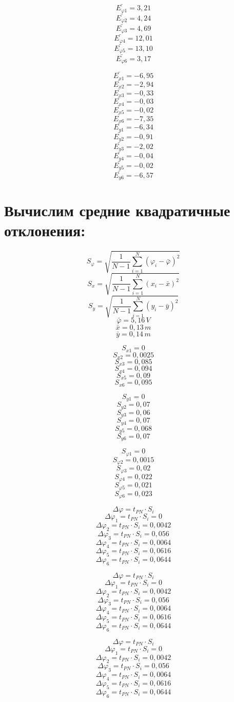 \documentclass[a4paper,12pt]{report}
\begin{document}
\[ \bar{E_{\varphi1}} =  3,21\]
\[ \bar{E_{\varphi2}} =  4,24\]
\[ \bar{E_{\varphi3}} =  4,69\]
\[ \bar{E_{\varphi4}} = 12,01\]
\[ \bar{E_{\varphi5}} = 13,10\]
\[ \bar{E_{\varphi6}} = 3,17 \]

\[ \bar{E_{x1}} = -6,95\]
\[ \bar{E_{x2}} = -2,94\]
\[ \bar{E_{x3}} = -0,33\]
\[ \bar{E_{x4}} = -0,03\]
\[ \bar{E_{x5}} = -0,02\]
\[ \bar{E_{x6}} = -7,35\]
\newpage
\[ \bar{E_{y1}} = -6,34\]
\[ \bar{E_{y2}} = -0,91\]
\[ \bar{E_{y3}} = -2,02\]
\[ \bar{E_{y4}} = -0,04\]
\[ \bar{E_{y5}} = -0,02\]
\[ \bar{E_{y6}} = -6,57\]

\section*{Вычислим средние квадратичные отклонения:}
\[ S_{\varphi} = \sqrt{\frac{1}{N-1}\sum_{i=1}^N(\varphi_i-\bar{\varphi})^2} \]
\[ S_{x} = \sqrt{\frac{1}{N-1}\sum_{i=1}^N(x_i-\bar{x})^2} \]
\[ S_{y} = \sqrt{\frac{1}{N-1}\sum_{i=1}^N(y_i-\bar{y})^2} \]
\[ \bar{\varphi} = 5,16 \, V \]
\[ \bar{x} = 0,13 \, m \]
\[ \bar{y} = 0,14 \, m \]

\[ S_{x1} = 0 \]
\[ S_{x2} = 0,0025 \]
\[ S_{x3} = 0,085 \]
\[ S_{x4} = 0,094 \]
\[ S_{x5} = 0,09 \]
\[ S_{x6} = 0,095 \]

\[ S_{y1} = 0 \]
\[ S_{y2} = 0,07 \]
\[ S_{y3} = 0,06 \]
\[ S_{y4} = 0,07 \]
\[ S_{y5} = 0,068 \]
\[ S_{y6} = 0,07 \]

\[ S_{\varphi1} = 0 \]
\[ S_{\varphi2} = 0,0015 \]
\[ S_{\varphi3} = 0,02 \]
\[ S_{\varphi4} = 0,022 \]
\[ S_{\varphi5} = 0,021 \]
\[ S_{\varphi6} = 0,023 \]

\[ \Delta{\varphi} = t_{PN}\cdot S_i\]
\[ \Delta{\varphi}_1 = t_{PN}\cdot S_i = 0\]
\[ \Delta{\varphi}_2 = t_{PN}\cdot S_i = 0,0042\]
\[ \Delta{\varphi}_3 = t_{PN}\cdot S_i = 0,056\]
\[ \Delta{\varphi}_4 = t_{PN}\cdot S_i = 0,0064\]
\[ \Delta{\varphi}_5 = t_{PN}\cdot S_i = 0,0616\]
\[ \Delta{\varphi}_6 = t_{PN}\cdot S_i = 0,0644\]

\[ \Delta{\varphi} = t_{PN}\cdot S_i\]
\[ \Delta{\varphi}_1 = t_{PN}\cdot S_i = 0\]
\[ \Delta{\varphi}_2 = t_{PN}\cdot S_i = 0,0042\]
\[ \Delta{\varphi}_3 = t_{PN}\cdot S_i = 0,056\]
\[ \Delta{\varphi}_4 = t_{PN}\cdot S_i = 0,0064\]
\[ \Delta{\varphi}_5 = t_{PN}\cdot S_i = 0,0616\]
\[ \Delta{\varphi}_6 = t_{PN}\cdot S_i = 0,0644\]

\[ \Delta{\varphi} = t_{PN}\cdot S_i\]
\[ \Delta{\varphi}_1 = t_{PN}\cdot S_i = 0\]
\[ \Delta{\varphi}_2 = t_{PN}\cdot S_i = 0,0042\]
\[ \Delta{\varphi}_3 = t_{PN}\cdot S_i = 0,056\]
\[ \Delta{\varphi}_4 = t_{PN}\cdot S_i = 0,0064\]
\[ \Delta{\varphi}_5 = t_{PN}\cdot S_i = 0,0616\]
\[ \Delta{\varphi}_6 = t_{PN}\cdot S_i = 0,0644\]
\end{document}
